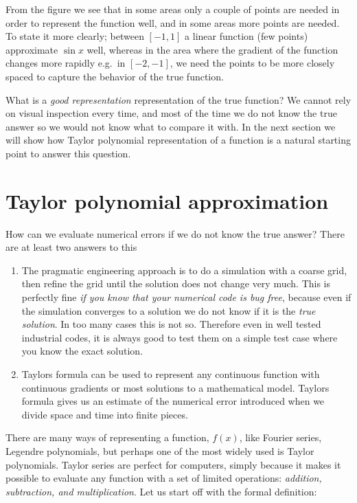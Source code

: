 \documentclass[graybox,sectrefs,envcountresetchap,open=right,final]{svmonodo}
\begin{document}
From the figure we see that in some areas only a couple of points are needed in order to
represent the function well, and in some areas more points are needed. To state it more clearly; between $[-1,1]$ a linear function (few points) approximate $\sin x$ well, 
whereas in the area where the gradient of the function changes more rapidly e.g.~in $[-2,-1]$, we need the points to be more closely spaced to capture the behavior of the true function.

What is a \emph{good representation} representation of the true function? We cannot rely on visual inspection every time, and most of the time we do not know the true answer so we would not know what to compare it with. In the next section we will show how Taylor polynomial representation of a function is a natural starting point to answer this question.

\section{Taylor polynomial approximation}
How can we evaluate numerical errors if we do not know the true answer? There are at least two answers to this

\begin{enumerate}
\item The pragmatic engineering approach is to do a simulation with a coarse grid, then refine the grid until the solution does not change very much. This is perfectly fine \emph{if you know that your numerical code is bug free}, because even if the simulation converges to a solution we do not know if it is the \emph{true solution}. In too many cases this is not so. Therefore even in well tested industrial codes, it is always good to test them on a simple test case where you know the exact solution.

\item Taylors formula can be used to represent any continuous function with continuous gradients or most solutions to a mathematical model. Taylors formula gives us an estimate of the numerical error introduced when we divide space and time into finite pieces.
\end{enumerate}

\noindent
There are many ways of representing a function, $f(x)$, like Fourier series, Legendre polynomials, but perhaps one of the most widely used is Taylor polynomials.   
Taylor series are perfect for computers, simply because it makes it possible to evaluate any function with a set of limited operations: \emph{addition, subtraction, and multiplication}. Let us start off with the formal definition: 
\end{document}
